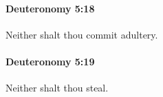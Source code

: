 		\paragraph{Deuteronomy 5:18} %
			\label{DEUTERONOMY-5-18}

			Neither shalt thou commit adultery.


		\paragraph{Deuteronomy 5:19} %
			\label{DEUTERONOMY-5-19}

			Neither shalt thou steal.


